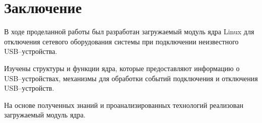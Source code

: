 \chapter*{Заключение}

В ходе проделанной работы был разработан загружаемый модуль ядра Linux для отключения сетевого оборудования системы при подключении неизвестного USB--устройства.

Изучены структуры и функции ядра, которые предоставляют информацию о USB--устройствах, механизмы для обработки событий подключения и отключения USB--устройств. 

На основе полученных знаний и проанализированных технологий реализован загружаемый модуль ядра.